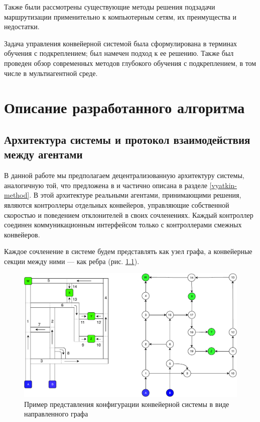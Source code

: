 \documentclass[specification,annotation,times]{itmo-student-thesis}
\theoremstyle{definition}
\begin{document}
Также были рассмотрены существующие методы решения подзадачи маршрутизации
применительно к компьютерным сетям, их преимущества и недостатки.

Задача управления конвейерной системой была сформулирована в терминах обучения с
подкреплением; был намечен подход к ее решению. Также был проведен обзор
современных методов глубокого обучения с подкреплением, в том числе в
мультиагентной среде.

\finishrelatedwork

\chapter{Описание разработанного алгоритма}\label{chapter-algorithm}

\section{Архитектура системы и протокол взаимодействия между агентами}

В данной работе мы предполагаем децентрализованную архитектуру системы,
аналогичную той, что предложена в \cite{black2009intelligent,
  vyatkin-controllers} и частично описана в разделе \ref{vyatkin-method}. В
этой архитектуре реальными агентами, принимающими решения, являются контроллеры
отдельных конвейеров, управляющие собственной скоростью и поведением
отклонителей в своих сочленениях. Каждый контроллер соединен коммуникационным
интерфейсом только с контроллерами смежных конвейеров.

Каждое сочленение в системе будем представлять как узел графа, а конвейерные
секции между ними --- как ребра (рис. \ref{conveyor-graph-representation}).

\begin{figure}[!h]
  \caption{Пример представления конфигурации конвейерной системы в виде
    направленного графа}\label{conveyor-graph-representation}
  \centering
  \includegraphics[width=\textwidth]{conveyor-1-illustration-2}
\end{figure}
\end{document}
